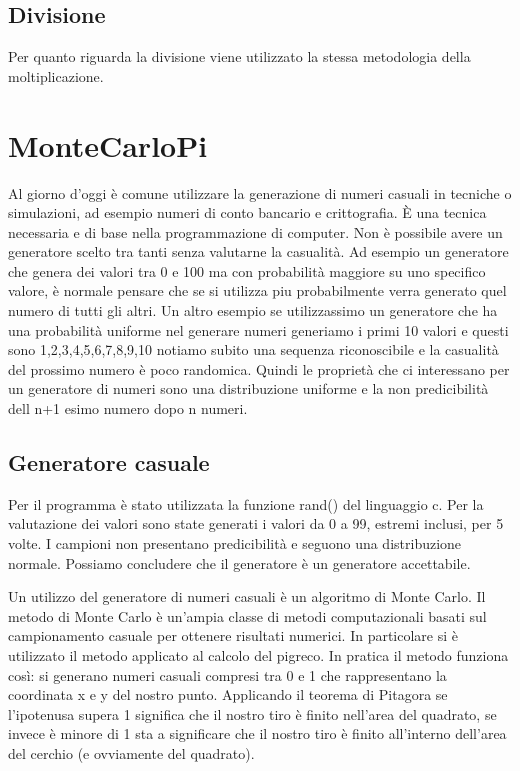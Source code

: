 \documentclass[12pt,a4paper]{report}
\begin{document}
\vspace{2cm}

\subsection{Divisione}

Per quanto riguarda la divisione viene utilizzato la stessa metodologia della moltiplicazione.




\section{MonteCarloPi}
Al giorno d'oggi è comune utilizzare la generazione di numeri casuali in tecniche o simulazioni, ad esempio numeri di conto bancario e crittografia. È una tecnica necessaria e di base nella programmazione di computer. Non è possibile avere un generatore scelto tra tanti senza valutarne la casualità. Ad esempio un generatore che genera dei valori tra 0 e 100 ma con probabilità maggiore su uno specifico valore, è normale pensare che se si utilizza piu probabilmente verra generato quel numero di tutti gli altri. Un altro esempio se utilizzassimo un generatore che ha  una probabilità uniforme nel generare numeri  generiamo i primi 10 valori e questi sono 1,2,3,4,5,6,7,8,9,10 notiamo subito una sequenza riconoscibile e la casualità del prossimo numero è poco randomica.
Quindi le proprietà che ci interessano per un generatore di numeri sono una distribuzione uniforme e la non predicibilità dell n+1 esimo numero dopo n numeri.

\subsection{Generatore casuale}
Per il programma è stato utilizzata la funzione rand() del linguaggio c. Per la valutazione dei valori sono state generati i valori da 0 a 99, estremi inclusi, per 5 volte. I campioni non presentano predicibilità e seguono una distribuzione normale. Possiamo concludere che il generatore è un generatore accettabile.


Un utilizzo del generatore di numeri casuali è un algoritmo di Monte Carlo. Il metodo di Monte Carlo è un'ampia classe di metodi computazionali basati sul campionamento casuale per ottenere risultati numerici.  In particolare si è utilizzato il metodo applicato al calcolo del pigreco.
In pratica il metodo funziona così: si generano numeri casuali compresi tra 0 e 1 che rappresentano la coordinata x e y del nostro punto. Applicando il teorema di Pitagora se l’ipotenusa supera 1 significa che il nostro tiro è finito nell’area del quadrato, se invece è minore di 1 sta a significare che il nostro tiro è finito all’interno dell’area del cerchio (e ovviamente del quadrato). 
\end{document}
